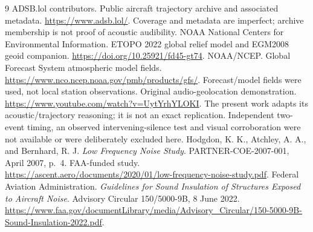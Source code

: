 \documentclass[11pt]{article}
\begin{document}
\begin{thebibliography}{9}\small
{} ADSB.lol contributors. Public aircraft trajectory archive and associated metadata. \url{https://www.adsb.lol/}. Coverage and metadata are imperfect; archive membership is not proof of acoustic audibility.
 NOAA National Centers for Environmental Information. ETOPO 2022 global relief model and EGM2008 geoid companion. \url{https://doi.org/10.25921/fd45-gt74}.
 NOAA/NCEP. Global Forecast System atmospheric model fields. \url{https://www.nco.ncep.noaa.gov/pmb/products/gfs/}. Forecast/model fields were used, not local station observations.
 Original audio-geolocation demonstration. \url{https://www.youtube.com/watch?v=UytYrhYLOKI}. The present work adapts its acoustic/trajectory reasoning; it is not an exact replication. Independent two-event timing, an observed intervening-silence test and visual corroboration were not available or were deliberately excluded here.
 Hodgdon, K. K., Atchley, A. A., and Bernhard, R. J. \textit{Low Frequency Noise Study}. PARTNER-COE-2007-001, April 2007, p.~4. FAA-funded study. \url{https://ascent.aero/documents/2020/01/low-frequency-noise-study.pdf}.
 Federal Aviation Administration. \textit{Guidelines for Sound Insulation of Structures Exposed to Aircraft Noise}. Advisory Circular 150/5000-9B, 8 June 2022. \url{https://www.faa.gov/documentLibrary/media/Advisory_Circular/150-5000-9B-Sound-Insulation-2022.pdf}.
\end{thebibliography}
\end{document}
